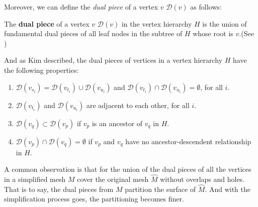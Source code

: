Moreover, we can define the \emph{dual piece} of a vertex $v$ $\mathcal{D}(v)$ as follows:
\begin{defn}
The \textbf{dual piece} of a vertex $v$ $\mathcal{D}(v)$ in the vertex hierarchy $H$ is the union of fundamental dual pieces of all leaf nodes in the subtree of $H$ whose root is $v$.(See )
\end{defn}
And as Kim \etal\cite{Kim:2001:trulyselective} described, the dual pieces of vertices in a vertex hierarchy $H$ have the following properties:
\begin{enumerate}
\item
$\mathcal{D}(v_{s_i})=\mathcal{D}(v_{t_i})\cup\mathcal{D}(v_{u_i})$ and $\mathcal{D}(v_{t_i})\cap\mathcal{D}(v_{u_i})=\emptyset$, for all $i$.
\item
$\mathcal{D}(v_{t_i})$ and $\mathcal{D}(v_{u_i})$ are adjacent to each other, for all $i$.
\item
$\mathcal{D}(v_q)\subset\mathcal{D}(v_p)$ if $v_p$ is an ancestor of $v_q$ in $H$.
\item
$\mathcal{D}(v_p)\cap\mathcal{D}(v_q)=\emptyset$ if $v_p$ and $v_q$ have no ancestor-descendent relationship in $H$.
\end{enumerate}


A common observation is that for the union of the dual pieces of all the vertices in a simplified mesh $M$ cover the original mesh $\hat{M}$ without overlaps and holes. That is to say, the dual pieces from $M$ partition the surface of $\hat{M}$. And with the simplification process goes, the partitioning becomes finer. \\

